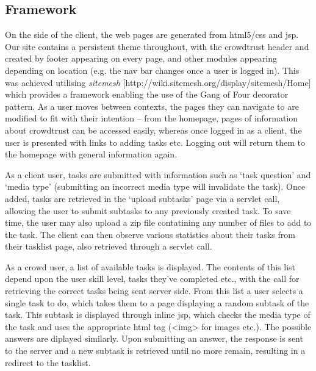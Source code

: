 \documentclass[11pt]{article}
\begin{document}
\subsection{Framework}
On the side of the client, the web pages are generated from html5/css and jsp. 
Our site contains a persistent theme throughout, with the crowdtrust header and
created by footer appearing on every page, and other modules appearing depending
on location (e.g. the nav bar changes once a user is logged in). This was achieved
utilising \emph{sitemesh} [http://wiki.sitemesh.org/display/sitemesh/Home]
which provides a framework enabling the use of the Gang of Four decorator pattern.
As a user moves between contexts, the pages they can navigate to are modified
to fit with their intention -- from the homepage, pages of information about
crowdtrust can be accessed easily, whereas once logged in as a client, the user
is presented with links to adding tasks etc. Logging out will return them to
the homepage with general information again.

As a client user, tasks are submitted with information such as `task question'
and `media type' (submitting an incorrect media type will invalidate the task).
Once added, tasks are retrieved in the `upload subtasks' page via a servlet call,
allowing the user to submit subtasks to any previously created task. To save time,
the user may also upload a zip file contatining any number of files to add to the task.
The client can then observe various statistics about their tasks from their tasklist page,
also retrieved through a servlet call.

As a crowd user, a list of available tasks is displayed. The
contents of this list depend upon the user skill level, tasks they've completed
etc., with the call for retrieving the correct tasks being sent server side. From
this list a user selects a single task to do, which takes them to a page displaying
a random subtask of the task. This subtask is displayed through inline jsp, which
checks the media type of the task and uses the appropriate html tag (<img> for images etc.).
The possible answers are diplayed similarly. Upon submitting an answer, the response
is sent to the server and a new subtask is retrieved until no more remain, resulting
in a redirect to the tasklist.
\end{document}
